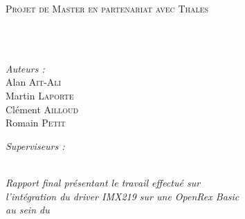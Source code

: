 \documentclass[
11pt, %
french, %
singlespacing, %
headsepline, %
]{MastersDoctoralThesis} %
\author{Alan \textsc{Ait-Ali}, Martin \textsc{Laporte}, \\
Clément \textsc{Ailloud} \& Romain \textsc{Petit} \\ } %
\begin{document}
\frontmatter %

\pagestyle{plain} %


\begin{titlepage}
\begin{center}

\vspace*{.06\textheight}
{\scshape\LARGE \univname\par}\vspace{1.5cm} %
\textsc{\Large Projet de Master en partenariat avec Thales}\\[0.5cm] %

\HRule \\[0.4cm] %
{\huge \bfseries \ttitle\par}\vspace{0.4cm} %
\HRule \\[1.5cm] %

\begin{minipage}[t]{0.4\textwidth}
\begin{flushleft} \large
\emph{Auteurs :}\\
Alan \textsc{Ait-Ali} \\
Martin \textsc{Laporte} \\
Clément \textsc{Ailloud} \\
Romain \textsc{Petit}
\end{flushleft}
\end{minipage}
\begin{minipage}[t]{0.4\textwidth}
\begin{flushright} \large
\emph{Superviseurs :} \\
\supname %
\end{flushright}
\end{minipage}\\[3cm]

\large \textit{Rapport final présentant le travail effectué sur \\
				l'intégration du driver IMX219 sur une OpenRex Basic}\\[0.3cm] %
\textit{au sein du}\\[0.4cm]
\deptname\\[2cm] %


\end{center}
\end{titlepage}
\end{document}

